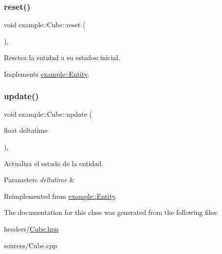 \subsubsection{\texorpdfstring{reset()}{reset()}}
{\footnotesize\ttfamily void example\+::\+Cube\+::reset (\begin{DoxyParamCaption}{ }\end{DoxyParamCaption})\hspace{0.3cm}{\ttfamily [override]}, {\ttfamily [virtual]}}



Resetea la entidad a su estadoo inicial. 



Implements \mbox{\hyperlink{classexample_1_1_entity_a38eec21167e85013a5e89a9131458bfa}{example\+::\+Entity}}.

\mbox{\label{classexample_1_1_cube_a16f3dba5c798aa09c8548e7d8d033b25}} 
\subsubsection{\texorpdfstring{update()}{update()}}
{\footnotesize\ttfamily void example\+::\+Cube\+::update (\begin{DoxyParamCaption}\item[{float}]{deltatime }\end{DoxyParamCaption})\hspace{0.3cm}{\ttfamily [override]}, {\ttfamily [virtual]}}



Actualiza el estado de la entidad. 


\begin{DoxyParams}{Parameters}
{\em deltatime} & \\
\hline
\end{DoxyParams}


Reimplemented from \mbox{\hyperlink{classexample_1_1_entity_a1f987399c6c2f5e83b2d245d81cc3b7e}{example\+::\+Entity}}.



The documentation for this class was generated from the following files\+:\begin{DoxyCompactItemize}
\item 
headers/\mbox{\hyperlink{_cube_8hpp}{Cube.\+hpp}}\item 
sources/Cube.\+cpp\end{DoxyCompactItemize}
